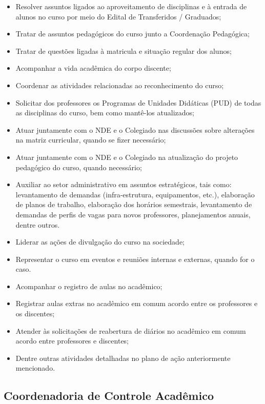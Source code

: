 \begin{itemize}
	\item Resolver assuntos ligados ao aproveitamento de disciplinas e à entrada de alunos no curso por meio do Edital de Transferidos / Graduados;
	\item Tratar de assuntos pedagógicos do curso junto a Coordenação Pedagógica;
	\item Tratar de questões ligadas à matricula e situação regular dos alunos;
	\item Acompanhar a vida acadêmica do corpo discente;
	\item Coordenar as atividades relacionadas ao reconhecimento do curso;
	\item Solicitar dos professores os Programas de Unidades Didáticas (PUD) de todas as disciplinas do curso, bem como mantê-los atualizados;
	\item Atuar juntamente com o NDE e o Colegiado nas discussões sobre alterações na matriz curricular, quando se fizer necessário;
	\item Atuar juntamente com o NDE e o Colegiado na atualização do projeto pedagógico do curso, quando necessário;
	\item Auxiliar ao setor administrativo em assuntos estratégicos, tais como: levantamento de demandas (infra-estrutura, equipamentos, etc.), elaboração de planos de trabalho, elaboração dos horários semestrais, levantamento de demandas de perfis de vagas para novos professores, planejamentos anuais, dentre outros.
	\item Liderar as ações de divulgação do curso na sociedade;
	\item Representar o curso em eventos e reuniões internas e externas, quando for o caso.
	\item Acompanhar o registro de aulas no acadêmico;
	\item Registrar aulas extras no acadêmico em comum acordo entre os professores e os discentes;
	\item Atender às solicitações de reabertura de diários no acadêmico em comum acordo entre professores e discentes;
	\item Dentre outras atividades detalhadas no plano de ação anteriormente mencionado.
\end{itemize}

\subsection{Coordenadoria de Controle Acadêmico}

